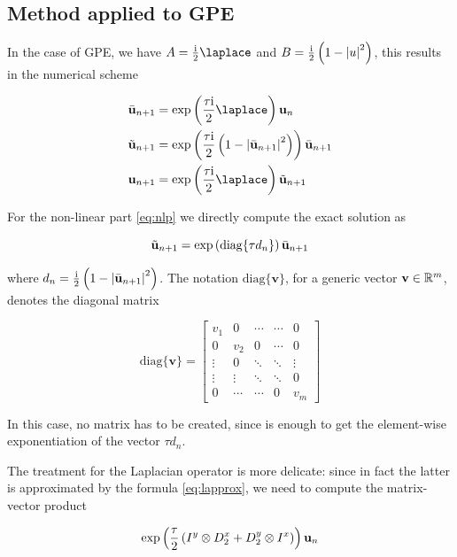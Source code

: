\subsection{Method applied to GPE}

In the case of GPE, we have $A = \frac\ii2 \lap$ and $B = \frac{\mathrm{i}}2 \left(1 - \left| u \right|^2\right)$, this results in the numerical scheme 

\begin{align}
    \bar{\uu}_{n+1} &= \exp\left(\frac{\tau\ii}{2} \lap\right) \uu_n \label{eq:l1} \\
    \tilde{\uu}_{n+1} &= \exp\left(\frac{\tau\ii}{2} \left(1 - \abs{\bar{\uu}_{n+1}}^2\right)\right)\bar{\uu}_{n+1} \label{eq:nlp} \\
    \uu_{n+1} &= \exp\left(\frac{\tau\ii}{2} \lap\right) \tilde{\uu}_{n+1} \label{eq:l2}
\end{align}

For the non-linear part \eqref{eq:nlp} we directly compute the exact solution as 

\[ \tilde{\mathbf{u}}_{n+1} = \exp\left(\mathrm{diag}\{ \tau d_n \}\right)\bar{\mathbf{u}}_{n+1} \]

where $d_n = \frac{\mathrm{i}}{2} \left(1 - \left| \bar{\mathbf{u}}_{n+1} \right|^2\right)$. The notation $\mathrm{diag}\{\mathbf{v}\}$, for a generic vector $\mathbf{v} \in \mathbb{R}^m$, denotes the diagonal matrix 

\begin{equation*}
    \mathrm{diag}\{\mathbf{v}\} = 
    \begin{bmatrix}
        v_1 & 0 & \cdots & \cdots & 0 \\
        0 & v_2 & 0 & \cdots & 0 \\
        \vdots & 0 & \ddots & \ddots & \vdots \\
        \vdots & \vdots & \ddots & \ddots & 0 \\
        0 & \cdots & \cdots & 0 & v_m
    \end{bmatrix} 
\end{equation*}

In this case, no matrix has to be created, since is enough to get the element-wise exponentiation of the vector $\tau d_n$.

The treatment for the Laplacian operator is more delicate: since in fact the latter is approximated by the formula \eqref{eq:lapprox}, we need to compute the matrix-vector product 

\[
    \exp\left(\frac\tau2 \left(I^y \otimes D_2^x + D_2^y \otimes I^x\right)\right)\mathbf{u}_n
\]

